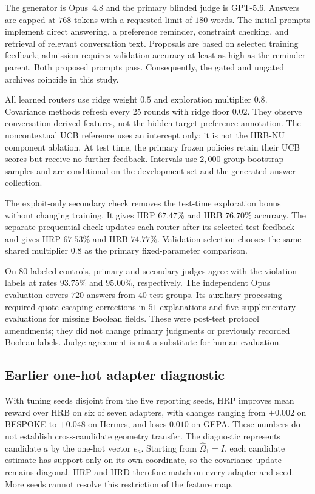 \documentclass{article} %
\begin{document}
The generator is Opus~4.8 and the primary blinded judge is GPT-5.6.
Answers are capped at $768$ tokens with a requested limit of $180$ words.
The initial prompts implement direct answering, a preference reminder,
constraint checking, and retrieval of relevant conversation text.
Proposals are based on selected training feedback; admission requires
validation accuracy at least as high as the reminder parent.
Both proposed prompts pass. Consequently, the gated and ungated archives
coincide in this study.

All learned routers use ridge weight $0.5$ and exploration multiplier
$0.8$. Covariance methods refresh every $25$ rounds with ridge floor
$0.02$. They observe conversation-derived features, not the hidden target
preference annotation. The noncontextual UCB reference uses an intercept
only; it is not the HRB-NU component ablation.
At test time, the primary frozen policies retain their UCB scores but
receive no further feedback. Intervals use $2{,}000$ group-bootstrap
samples and are conditional on the development set and the generated
answer collection.

The exploit-only secondary check removes the test-time exploration bonus
without changing training. It gives HRP $67.47\%$ and HRB $76.70\%$
accuracy. The separate prequential check updates each router after its
selected test feedback and gives HRP $67.53\%$ and HRB $74.77\%$.
Validation selection chooses the same shared multiplier $0.8$ as the
primary fixed-parameter comparison.

On $80$ labeled controls, primary and secondary judges agree with the
violation labels at rates $93.75\%$ and $95.00\%$, respectively.
The independent Opus evaluation covers $720$ answers from $40$ test groups.
Its auxiliary processing required quote-escaping corrections in $51$
explanations and five supplementary evaluations for missing Boolean
fields. These were post-test protocol amendments; they did not change
primary judgments or previously recorded Boolean labels. Judge agreement
is not a substitute for human evaluation.

\subsection{Earlier one-hot adapter diagnostic}
With tuning seeds disjoint from the five reporting seeds, HRP improves mean reward over HRB on six of seven adapters, with changes ranging from $+0.002$ on BESPOKE to $+0.048$ on Hermes, and loses $0.010$ on GEPA. These numbers do not establish cross-candidate geometry transfer. The diagnostic represents candidate $a$ by the one-hot vector $e_a$. Starting from $\widehat{\Omega}_1=I$, each candidate estimate has support only on its own coordinate, so the covariance update remains diagonal. HRP and HRD therefore match on every adapter and seed. More seeds cannot resolve this restriction of the feature map.
\end{document}
